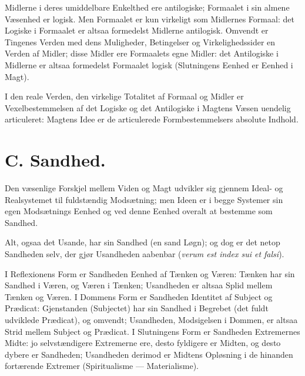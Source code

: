 \documentclass[12pt]{book}
\newcommand{\opage}[1]{\marginnote{\footnotesize\textit{[#1]}}}
\begin{document}
Midlerne i deres umiddelbare Enkelthed ere
antilogiske; Formaalet i sin almene Væsenhed er logisk. Men
Formaalet er kun virkeligt som Midlernes Formaal: det
Logiske i Formaalet er altsaa formedelst Midlerne
antilogisk. Omvendt er Tingenes Verden med dens Muligheder,
Betingelser og Virkelighedssider en Verden af Midler; disse
\opage{48} Midler ere Formaalets egne Midler: det Antilogiske i
Midlerne er altsaa formedelst Formaalet logisk (Slutningens
Eenhed er Eenhed i Magt).

I den reale Verden, den virkelige Totalitet af
Formaal og Midler er Vexelbestemmelsen af det Logiske og det
Antilogiske i Magtens Væsen uendelig articuleret:
Magtens Idee er de articulerede Formbestemmelsers absolute
Indhold.


\chapter*{C. Sandhed.}
\opage{49} %

Den væsenlige Forskjel mellem Viden og Magt udvikler sig gjennem
Ideal- og Realsystemet til fuldstændig Modsætning; men Ideen er i
begge Systemer sin egen Modsætnings Eenhed og ved denne Eenhed
overalt at bestemme som Sandhed.

Alt, ogsaa det Usande, har sin Sandhed (en sand Løgn); og dog er det
netop Sandheden selv, der gjør Usandheden aabenbar (\textit{verum est
index sui et falsi}).

I Reflexionens Form er Sandheden Eenhed af Tænken og Væren: Tænken
har sin Sandhed i Væren, og Væren i Tænken; Usandheden er altsaa
Splid mellem Tænken og Væren. I Dommens Form er Sandheden Identitet
af Subject og Prædicat: Gjenstanden (Subjectet) har sin Sandhed i
Begrebet (det fuldt udviklede Prædicat), og omvendt; Usandheden,
Modsigelsen i Dommen, er altsaa Strid mellem Subject og Prædicat.
I Slutningens Form er Sandheden Extremernes Midte: jo selvstændigere
Extremerne ere, desto fyldigere er Midten, og desto dybere er
Sandheden; Usandheden derimod er Midtens Opløsning i de hinanden
fortærende Extremer (Spiritualisme --- Materialisme).
\end{document}
